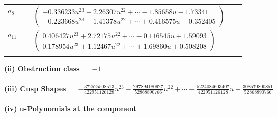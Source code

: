 \documentclass[1p]{elsarticle_modified}
\theoremstyle{definition}
\begin{document}
\begin{tabular}{m{7pt} m{180pt} m{7pt} m{180pt} }
\flushright $a_{8}=$&$\begin{pmatrix}-0.336233 u^{23}-2.26307 u^{22}+\cdots-1.85658 u-1.73341\\-0.223668 u^{23}-1.41378 u^{22}+\cdots+0.416575 u-0.352405\end{pmatrix}$ \\
\flushright $a_{11}=$&$\begin{pmatrix}0.406427 u^{23}+2.72175 u^{22}+\cdots-0.116545 u+1.59093\\0.178954 u^{23}+1.12467 u^{22}+\cdots+1.69860 u+0.508208\end{pmatrix}$\\&\end{tabular}
\flushleft \textbf{(ii) Obstruction class $= -1$}\\~\\
\flushleft \textbf{(iii) Cusp Shapes $= -\frac{372525508513}{422951126128} u^{23}-\frac{297894180927}{52868890766} u^{22}+\cdots-\frac{5224084603407}{422951126128} u-\frac{308570800851}{52868890766}$}\\~\\
\newpage\renewcommand{\arraystretch}{1}
\flushleft \textbf{(iv) u-Polynomials at the component}\newline \\
\end{document}
